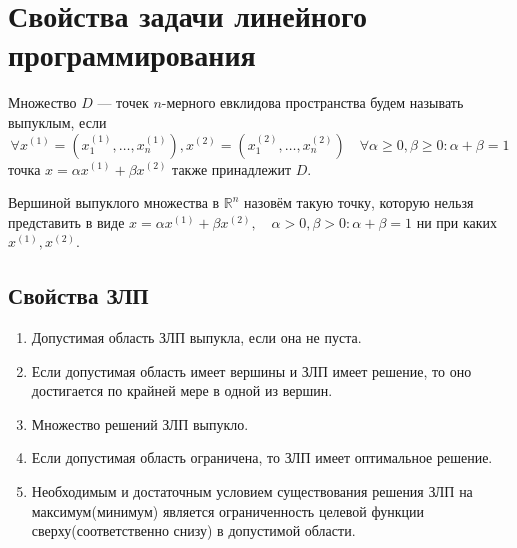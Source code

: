 \documentclass[17pt]{extarticle}
\begin{document}
\section{Свойства задачи линейного \\ программирования}

\begin{definition}
    Множество \( D \) — точек \( n \)-мерного евклидова пространства будем называть выпуклым, если
    \[
        \forall x^{(1)} = (x_1^{(1)}, \ldots, x_n^{(1)}), x^{(2)} = (x_1^{(2)}, \ldots, x_n^{(2)})
        \quad \forall \alpha \geq 0, \beta \geq 0 \colon \alpha + \beta = 1
    \]
    точка \(x = \alpha x^{(1)} + \beta x^{(2)}\) также принадлежит \( D \).
\end{definition}

\begin{definition}
    Вершиной выпуклого множества в \( \mathbb{R}^n \) назовём такую точку, которую нельзя представить в виде
    \(
    x = \alpha x^{(1)} + \beta x^{(2)}, \quad \alpha > 0, \beta > 0 \colon \alpha + \beta = 1
    \)
    ни при каких \(x^{(1)}, x^{(2)}\).
\end{definition}

\subsection{Свойства ЗЛП}
\begin{enumerate}
    \item Допустимая область ЗЛП выпукла, если она не пуста.
    \item Если допустимая область имеет вершины и ЗЛП имеет решение, то оно достигается по крайней мере в одной из вершин.
    \item Множество решений ЗЛП выпукло.
    \item Если допустимая область ограничена, то ЗЛП имеет оптимальное решение.
    \item Необходимым и достаточным условием существования решения ЗЛП на максимум(минимум) является
          ограниченность целевой функции сверху(соответственно снизу) в допустимой области.
\end{enumerate}
\end{document}
